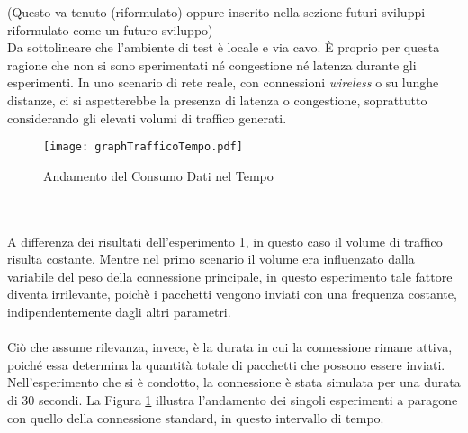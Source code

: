 \noindent (Questo va tenuto (riformulato) oppure inserito nella sezione futuri sviluppi riformulato come un futuro sviluppo)\\
Da sottolineare che l'ambiente di test è locale e via cavo. È proprio per questa ragione che non si sono sperimentati né congestione né latenza durante gli esperimenti. 
In uno scenario di rete reale, con connessioni \emph{wireless} o su lunghe distanze, ci si aspetterebbe la presenza di latenza o congestione, soprattutto considerando gli elevati volumi di traffico generati. 
\begin{figure}[!h]
    \centering
        \texttt{[image: graphTrafficoTempo.pdf]}
        \caption{Andamento del Consumo Dati nel Tempo}
        \label{grafico23}
\end{figure}
\\\\
\noindent A differenza dei risultati dell'esperimento 1, in questo caso il volume di traffico risulta costante.
Mentre nel primo scenario il volume era influenzato dalla variabile del peso della connessione principale, in questo esperimento tale fattore diventa irrilevante,
poichè i pacchetti vengono inviati con una frequenza costante, indipendentemente dagli altri parametri.
\\\\
Ciò che assume rilevanza, invece, è la durata in cui la connessione rimane attiva, poiché essa determina la quantità totale di pacchetti che possono essere inviati.
Nell'esperimento che si è condotto, la connessione è stata simulata per una durata di 30 secondi. La Figura \ref{grafico23} illustra l'andamento dei singoli esperimenti a paragone con quello della connessione standard, in questo intervallo di tempo.

